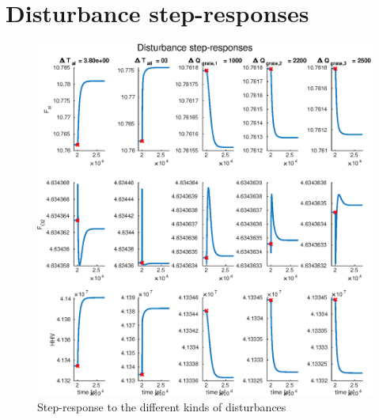 \section{Disturbance step-responses}


\begin{figure}[!ht]
    \includegraphics[width=\textwidth]{img/Simple_analysis_plots/Unscaled_disturbance_step_responses.eps}
    \caption{Step-response to the different kinds of disturbances}
    \label{fig:Unscaled_disturbance_response}
\end{figure}


